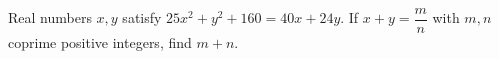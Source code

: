 Real numbers $x,y$ satisfy $25x^2+y^2+160=40x+24y$. If $x+y=\dfrac mn$ with $m,n$ coprime positive integers, find $m+n$.
